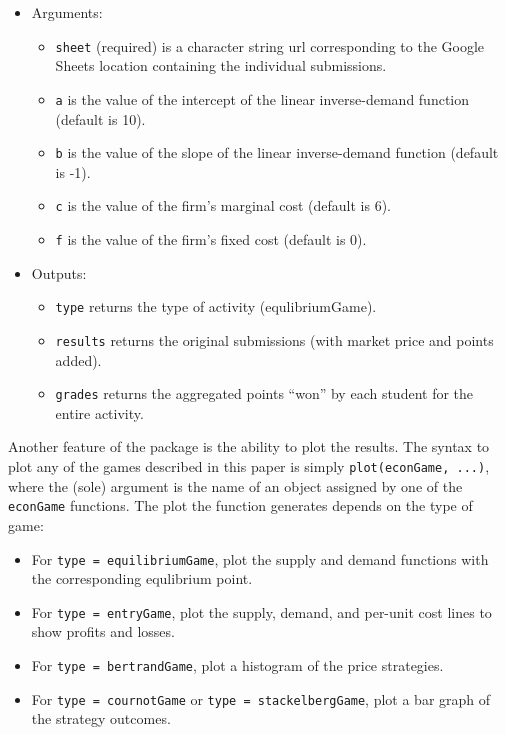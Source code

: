 \documentclass[
]{article}
\providecommand{\tightlist}{%
  \setlength{\itemsep}{0pt}\setlength{\parskip}{0pt}}
\begin{document}
\begin{itemize}
  \begin{itemize}
  \item
    Arguments:

    \begin{itemize}
    \tightlist
    \item
      \texttt{sheet} (required) is a character string url corresponding
      to the Google Sheets location containing the individual
      submissions.
    \item
      \texttt{a} is the value of the intercept of the linear
      inverse-demand function (default is 10).
    \item
      \texttt{b} is the value of the slope of the linear inverse-demand
      function (default is -1).
    \item
      \texttt{c} is the value of the firm's marginal cost (default is
      6).
    \item
      \texttt{f} is the value of the firm's fixed cost (default is 0).
    \end{itemize}
  \item
    Outputs:

    \begin{itemize}
    \tightlist
    \item
      \texttt{type} returns the type of activity (equlibriumGame).
    \item
      \texttt{results} returns the original submissions (with market
      price and points added).
    \item
      \texttt{grades} returns the aggregated points ``won'' by each
      student for the entire activity.
    \end{itemize}
  \end{itemize}
\end{itemize}

Another feature of the package is the ability to plot the results. The
syntax to plot any of the games described in this paper is simply
\texttt{plot(econGame,\ ...)}, where the (sole) argument is the name of
an object assigned by one of the \texttt{econGame} functions. The plot
the function generates depends on the type of game:

\begin{itemize}
\tightlist
\item
  For
  \texttt{type\ =\ \textquotesingle{}equilibriumGame\textquotesingle{}},
  plot the supply and demand functions with the corresponding equlibrium
  point.
\item
  For \texttt{type\ =\ \textquotesingle{}entryGame\textquotesingle{}},
  plot the supply, demand, and per-unit cost lines to show profits and
  losses.
\item
  For
  \texttt{type\ =\ \textquotesingle{}bertrandGame\textquotesingle{}},
  plot a histogram of the price strategies.
\item
  For \texttt{type\ =\ \textquotesingle{}cournotGame\textquotesingle{}}
  or
  \texttt{type\ =\ \textquotesingle{}stackelbergGame\textquotesingle{}},
  plot a bar graph of the strategy outcomes.
\end{itemize}
\end{document}
